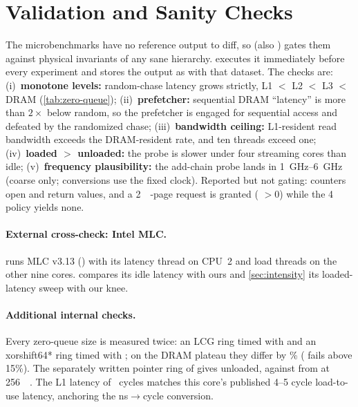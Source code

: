 \section{Validation and Sanity Checks}\label{sec:validation}

The microbenchmarks have no reference output to diff, so  (also
) gates them against physical invariants of any sane hierarchy.  executes it immediately
before every experiment and stores the output as  with that dataset. The checks are:
(i)~\textbf{monotone levels:} random-chase latency grows strictly, L1 $<$ L2 $<$ L3 $<$ DRAM
(\cref{tab:zero-queue}); (ii)~\textbf{prefetcher:} sequential DRAM ``latency'' is more than $2\times$ below
random, so the prefetcher is engaged for sequential access and defeated by the randomized chase;
(iii)~\textbf{bandwidth ceiling:} L1-resident read bandwidth exceeds the DRAM-resident rate, and ten threads
exceed one; (iv)~\textbf{loaded $>$ unloaded:} the  probe is slower under four streaming
cores than idle; (v)~\textbf{frequency plausibility:} the add-chain probe lands in
\qtyrange{1}{6}{\giga\hertz} (coarse only; conversions use the fixed clock). Reported but not gating:
counters open and return values, and a \qty{2}{\mebi\byte}-page request is granted (
$>0$) while the \qty{4}{\kibi\byte} policy yields none.

\paragraph{External cross-check: Intel MLC.}  runs MLC v3.13 () with its
latency thread on CPU~2 and load threads on the other nine cores.  compares its idle
latency with ours and \cref{sec:intensity} its loaded-latency sweep with our knee.

\paragraph{Additional internal checks.} Every zero-queue size is measured twice: an LCG ring timed with
 and an xorshift64* ring timed with ; on the DRAM plateau they differ by
\% ( fails above 15\%). The separately written pointer ring of
 gives  unloaded, against 
from  at \qty{256}{\mebi\byte}. The L1 latency of ~cycles matches this
core's published 4--5 cycle load-to-use latency, anchoring the ns$\to$cycle conversion.
